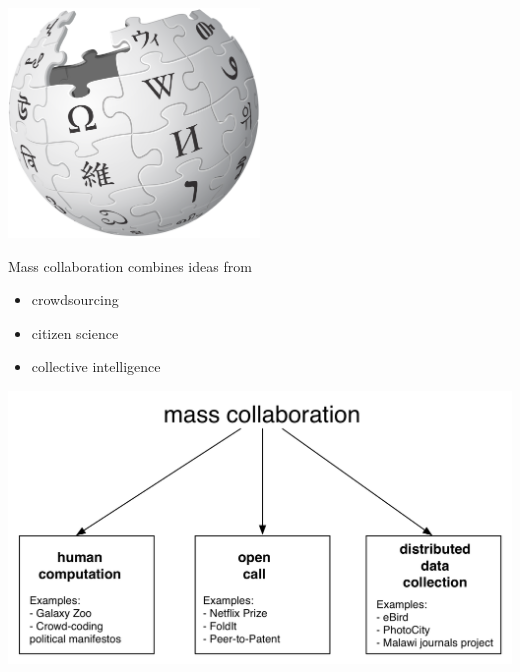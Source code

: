 \documentclass[aspectratio=169]{beamer}
\begin{document}
\begin{frame}

\begin{center}
\includegraphics[width=0.5\textwidth]{figures/wikipedia_logo}
\end{center}

\end{frame}
\begin{frame}

Mass collaboration combines ideas from 
\begin{itemize}
\item crowdsourcing
\item citizen science
\item collective intelligence
\end{itemize}

\end{frame}
\begin{frame}

\begin{center}
\includegraphics[width=\textwidth]{figures/mass_collaboration_schematic}
\end{center}

\end{frame}
\end{document}
